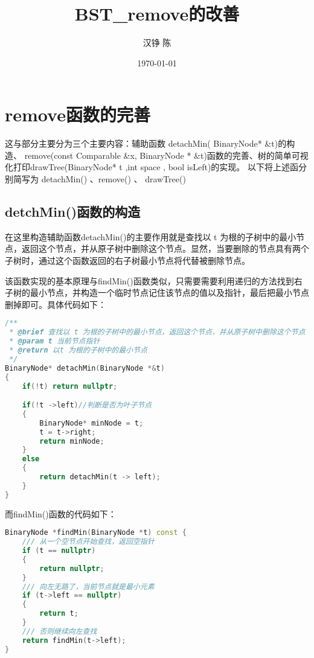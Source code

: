 \documentclass[fontset=fandol]{ctexart}
\title{BST\_remove的改善}
\author{汉铮 陈}
\date{\today}
\begin{document}
\maketitle

\section{remove函数的完善}
这与部分主要分为三个主要内容：辅助函数 detachMin( BinaryNode* \&t)的构造、
remove(const Comparable \&x, BinaryNode * \&t)函数的完善、树的简单可视化打印drawTree(BinaryNode* t ,int space , bool isLeft)的实现。
以下将上述函分别简写为 detachMin() 、remove() 、 drawTree()

\subsection{detchMin()函数的构造}
在这里构造辅助函数detachMin()的主要作用就是查找以 t 为根的子树中的最小节点，返回这个节点，并从原子树中删除这个节点。显然，当要删除的节点具有两个子树时，通过这个函数返回的右子树最小节点将代替被删除节点。\par
该函数实现的基本原理与findMin()函数类似，只需要需要利用递归的方法找到右子树的最小节点，并构造一个临时节点记住该节点的值以及指针，最后把最小节点删掉即可。具体代码如下：

\begin{lstlisting}[language=C++, caption={detachMin()函数}]  
/**
 * @brief 查找以 t 为根的子树中的最小节点，返回这个节点，并从原子树中删除这个节点
 * @param t 当前节点指针
 * @return 以t 为根的子树中的最小节点
 */
BinaryNode* detachMin(BinaryNode *&t)
{
    if(!t) return nullptr;

    if(!t ->left)//判断是否为叶子节点
    {
        BinaryNode* minNode = t;
        t = t->right;
        return minNode; 
    }
    else
    {
        return detachMin(t -> left);
    }
}
\end{lstlisting}

而findMin()函数的代码如下：
\begin{lstlisting}[language=C++, caption={findMin()函数}]  
BinaryNode *findMin(BinaryNode *t) const {
    /// 从一个空节点开始查找，返回空指针                
    if (t == nullptr) 
    {
        return nullptr;
    }
    /// 向左无路了，当前节点就是最小元素
    if (t->left == nullptr) 
    {
        return t;
    }
    /// 否则继续向左查找
    return findMin(t->left);
}
\end{lstlisting}
\end{document}
